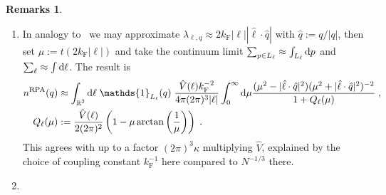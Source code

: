 \documentclass[12pt,a4paper]{article}
\numberwithin{equation}{section}
\newcommand{\1}{\mathbb{I}}
\renewcommand{\b}{\textnormal{b}}
\newcommand{\corr}{\textnormal{corr}}
\newcommand{\di}{\textnormal{d}}
\newcommand{\ex}{\mathrm{ex}}
\newcommand{\F}{\mathrm{F}}
\newcommand{\RPA}{\mathrm{RPA}}
\DeclareMathOperator{\R}{\mathbb{R}}
\theoremstyle{plain}
\theoremstyle{definition}
\newtheorem*{remarks}{Remarks}
\theoremstyle{remark}
\theoremstyle{plain}
\theoremstyle{definition}
\theoremstyle{remark}
\begin{document}
\begin{remarks}
\begin{enumerate}


\item In analogy to~\cite[Section~1.1]{BL25} we may approximate $ \lambda_{\ell,q} \approx 2 k_{\F} |\ell| |\hat{\ell} \cdot \hat{q}| $ with $ \hat{q} := {q}/{|q|} $, then set $ \mu := t (2 k_{\F} |\ell|) $ and take the continuum limit $ \sum_{p \in L_\ell} \approx \int_{L_\ell} \di p $ and $ \sum_\ell \approx \int \di \ell $. The result is
\begin{equation}
\begin{aligned}
	n^{\RPA}(q)
	&\approx \int_{\R^3} \di \ell \; \mathds{1}_{L_{\ell}}(q) \; \frac{\hat{V}(\ell) k_{\F}^{-2}}{4 \pi (2 \pi)^3 |\ell|}
		\int_0^\infty \di \mu \frac{(\mu^2-|\hat{\ell} \cdot \hat{q}|^2) (\mu^2 + |\hat{\ell} \cdot \hat{q}|^2)^{-2}}{1 + Q_\ell(\mu)} \;, \\
	Q_\ell(\mu) &:= \frac{\hat{V}(\ell)}{2 (2 \pi)^2} \left( 1 - \mu \arctan \left( \frac{1}{\mu} \right) \right) \;.
\end{aligned}
\end{equation}
This agrees with \cite{BL25} up to a factor $ (2 \pi)^3 \kappa $ multiplying $\hat{V}$, explained by the choice of coupling constant $k_\F^{-1}$ here compared to $N^{-1/3}$ there.

\item


\end{enumerate}
\end{remarks}
\end{document}
